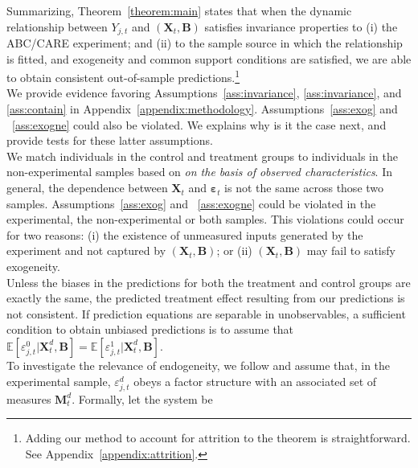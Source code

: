 \noindent Summarizing, Theorem~\ref{theorem:main} states that when the dynamic relationship between $Y_{j,t}$ and $\left( \bm{X}_{t}, \bm{B} \right)$ satisfies invariance properties to (i) the ABC/CARE experiment; and (ii) to the sample source in which the relationship is fitted, and exogeneity and common support conditions are satisfied, we are able to obtain consistent out-of-sample predictions.\footnote{Adding our method to account for attrition to the theorem is straightforward. See Appendix~\ref{appendix:attrition}.}\\

\noindent We provide evidence favoring Assumptions~\ref{ass:invariance}, \ref{ass:invariance}, and \ref{ass:contain} in Appendix~\ref{appendix:methodology}. Assumptions~\ref{ass:exog} and ~\ref{ass:exogne} could also be violated. We explains why is it the case next, and provide tests for these latter assumptions.\\

\noindent We match individuals in the control and treatment groups to individuals in the non-experimental samples based on \textit{on the basis of observed characteristics}. In general, the dependence between $\bm{X}_{t}$ and $\bm{\varepsilon}_{t}$ is not the same across those two samples. Assumptions~\ref{ass:exog} and ~\ref{ass:exogne} could be violated in the experimental, the non-experimental or both samples. This violations could occur for two reasons: (i) the existence of unmeasured inputs generated by the experiment and not captured by $\left( \bm{X}_{t}, \bm{B} \right)$; or (ii) $\left( \bm{X}_{t}, \bm{B} \right)$ may fail to satisfy exogeneity.\\

\noindent Unless the biases in the predictions for both the treatment and control groups are exactly the same, the predicted treatment effect resulting from our predictions is not consistent. If prediction equations are separable in unobservables, a sufficient condition to obtain unbiased predictions is to assume that $\mathbb{E} \left[ \varepsilon_{j,t}^0 | \bm{X}_{t}^d, \bm{B} \right] = \mathbb{E} \left[ \varepsilon_{j,t}^1 | \bm{X}_{t}^d, \bm{B} \right]$.\\

\noindent To investigate the relevance of endogeneity, we follow \citet{Heckman_Pinto_etal_2013_PerryFactor} and assume that, in the experimental sample, $\varepsilon_{j,t}^d$ obeys a factor structure with an associated set of measures $\bm{M}_{t}^d$. Formally, let the system be

